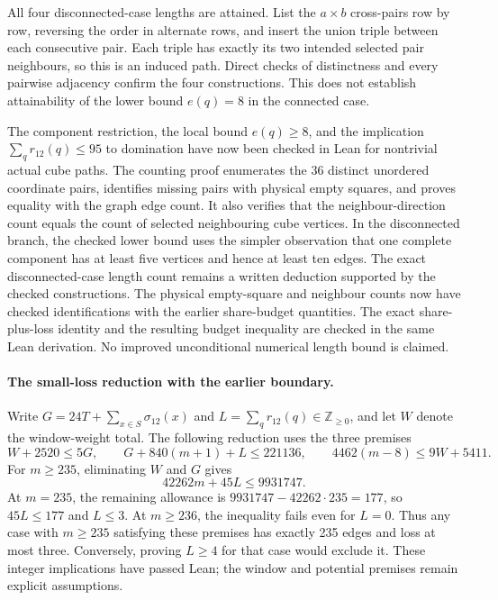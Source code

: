 \documentclass[11pt,a4paper]{article}
\theoremstyle{definition}
\theoremstyle{remark}
\begin{document}
All four disconnected-case lengths are attained. List the $a\times b$
cross-pairs row by row, reversing the order in alternate rows, and insert
the union triple between each consecutive pair. Each triple has exactly
its two intended selected pair neighbours, so this is an induced path.
Direct checks of distinctness and every pairwise adjacency confirm the
four constructions. This does not establish attainability of the lower
bound $e(q)=8$ in the connected case.

The component restriction, the local bound $e(q)\ge8$, and the implication
$\sum_q r_{12}(q)\le95$ to domination have now been checked in Lean for nontrivial actual
cube paths. The counting proof enumerates the 36 distinct unordered
coordinate pairs, identifies missing pairs with physical empty squares,
and proves equality with the graph edge count. It also verifies that the
neighbour-direction count equals the count of selected neighbouring cube
vertices. In the disconnected branch, the checked lower bound uses the
simpler observation that one complete component has at least five vertices
and hence at least ten edges. The exact disconnected-case length count
remains a written deduction supported by the checked constructions.
The physical empty-square and neighbour counts now have checked
identifications with the earlier share-budget quantities. The exact
share-plus-loss identity and the resulting budget inequality are checked
in the same Lean derivation.
No improved unconditional numerical length bound is claimed.

\paragraph{The small-loss reduction with the earlier boundary.}
Write $G=24T+\sum_{x\in S}\sigma_{12}(x)$ and
$L=\sum_q r_{12}(q)\in\mathbb Z_{\ge0}$, and let $W$ denote the
window-weight total. The following reduction uses the three premises
\[
W+2520\le5G,\qquad G+840(m+1)+L\le221136,\qquad
4462(m-8)\le9W+5411.
\]
For $m\ge235$, eliminating $W$ and $G$ gives
\[
42262m+45L\le9931747.
\]
At $m=235$, the remaining allowance is
$9931747-42262\cdot235=177$, so $45L\le177$ and $L\le3$.
At $m\ge236$, the inequality fails even for $L=0$.
Thus any case with $m\ge235$ satisfying these premises has exactly
235 edges and loss at most three. Conversely, proving $L\ge4$ for that
case would exclude it. These integer implications have passed Lean;
the window and potential premises remain explicit assumptions.
\end{document}
